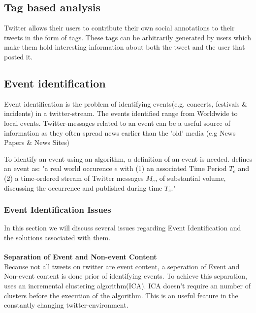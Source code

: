 \documentclass{article}
\begin{document}
\subsection{Tag based analysis}

Twitter allows their users to contribute their own social annotations to their tweets in the form of tags. These tags can be arbitrarily generated by users 
which make them hold interesting information about both the tweet and the user that posted it.

\subsection{Event identification}

Event identification is the problem of identifying events(e.g. concerts, festivals \& incidents) in a twitter-stream. The events identified range from Worldwide to local events. Twitter-messages related to an event can be a useful source of information as they often spread news earlier than the 'old' media (e.g News Papers \& News Sites)

To identify an event using an algorithm, a definition of an event is needed. \cite{eventident} defines an event as: "a real world occurence $e$ with (1) an associated Time Period $T_e$ and (2) a time-ordered stream of Twitter messages $M_e$, of substantial volume, discussing the
occurrence and published during time $T_e$."

\subsubsection{Event Identification Issues}
In this section we will discuss several issues regarding Event Identification and the solutions associated with them.
\\\\ 
\textbf{Separation of Event and Non-event Content}\\
Because not all tweets on twitter are event content, a seperation of Event and Non-event content is done prior of identifying events. To achieve this separation, \cite{eventident} uses an incremental clustering algorithm(ICA). ICA doesn't require an number of clusters before the execution of the algorithm. This is an useful feature in the constantly changing twitter-environment.
\end{document}
